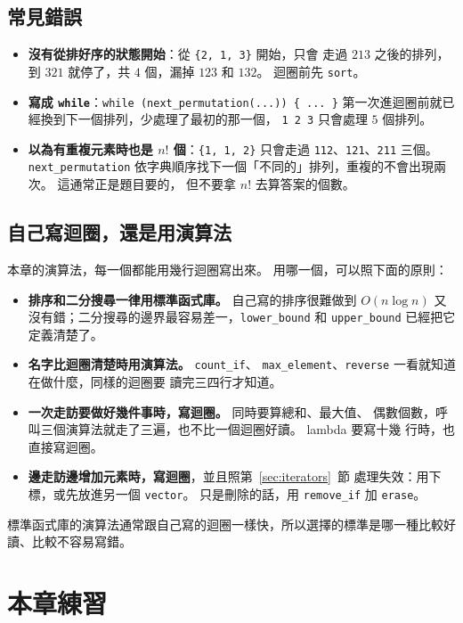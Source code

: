 \subsection{常見錯誤}

\begin{itemize}
\item \textbf{沒有從排好序的狀態開始}：從 \texttt{\{2, 1, 3\}} 開始，只會
走過 $213$ 之後的排列，到 $321$ 就停了，共 $4$ 個，漏掉 $123$ 和 $132$。
迴圈前先 \texttt{sort}。
\item \textbf{寫成 \texttt{while}}：\texttt{while (next\_permutation(...))
\{ ... \}} 第一次進迴圈前就已經換到下一個排列，少處理了最初的那一個，
\texttt{1 2 3} 只會處理 $5$ 個排列。
\item \textbf{以為有重複元素時也是 $n!$ 個}：\texttt{\{1, 1, 2\}} 只會走過
\texttt{112}、\texttt{121}、\texttt{211} 三個。 \texttt{next\_permutation}
依字典順序找下一個「不同的」排列，重複的不會出現兩次。 這通常正是題目要的，
但不要拿 $n!$ 去算答案的個數。
\end{itemize}

\subsection{自己寫迴圈，還是用演算法}

本章的演算法，每一個都能用幾行迴圈寫出來。 用哪一個，可以照下面的原則：

\begin{itemize}
\item \textbf{排序和二分搜尋一律用標準函式庫。} 自己寫的排序很難做到
$O(n \log n)$ 又沒有錯；二分搜尋的邊界最容易差一，\texttt{lower\_bound}
和 \texttt{upper\_bound} 已經把它定義清楚了。
\item \textbf{名字比迴圈清楚時用演算法。} \texttt{count\_if}、
\texttt{max\_element}、\texttt{reverse} 一看就知道在做什麼，同樣的迴圈要
讀完三四行才知道。
\item \textbf{一次走訪要做好幾件事時，寫迴圈。} 同時要算總和、最大值、
偶數個數，呼叫三個演算法就走了三遍，也不比一個迴圈好讀。 lambda 要寫十幾
行時，也直接寫迴圈。
\item \textbf{邊走訪邊增加元素時，寫迴圈}，並且照第~\ref{sec:iterators}~節
處理失效：用下標，或先放進另一個 \texttt{vector}。 只是刪除的話，用
\texttt{remove\_if} 加 \texttt{erase}。
\end{itemize}

標準函式庫的演算法通常跟自己寫的迴圈一樣快，所以選擇的標準是哪一種比較好
讀、比較不容易寫錯。

\section{本章練習}
\label{sec:ch9-exercises}

